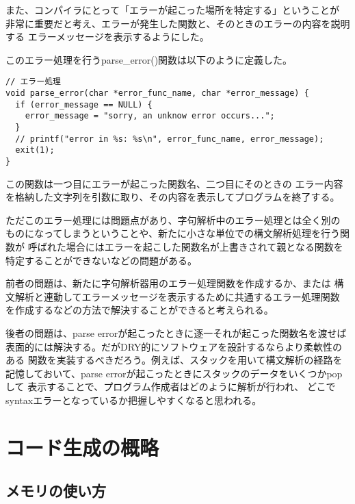 \documentclass[11pt,a4j]{jarticle}
\begin{document}
また、コンパイラにとって「エラーが起こった場所を特定する」ということが
非常に重要だと考え、エラーが発生した関数と、そのときのエラーの内容を説明する
エラーメッセージを表示するようにした。

このエラー処理を行うparse\_error()関数は以下のように定義した。

\begin{verbatim}
// エラー処理
void parse_error(char *error_func_name, char *error_message) {
  if (error_message == NULL) {
    error_message = "sorry, an unknow error occurs...";
  }
  // printf("error in %s: %s\n", error_func_name, error_message);
  exit(1);
}
\end{verbatim}

この関数は一つ目にエラーが起こった関数名、二つ目にそのときの
エラー内容を格納した文字列を引数に取り、その内容を表示してプログラムを終了する。

ただこのエラー処理には問題点があり、字句解析中のエラー処理とは全く別の
ものになってしまうということや、新たに小さな単位での構文解析処理を行う関数が
呼ばれた場合にはエラーを起こした関数名が上書きされて親となる関数を
特定することができないなどの問題がある。

\vspace{0.2in}

前者の問題は、新たに字句解析器用のエラー処理関数を作成するか、または
構文解析と連動してエラーメッセージを表示するために共通するエラー処理関数
を作成するなどの方法で解決することができると考えられる。

\vspace{0.2in}

後者の問題は、parse errorが起こったときに逐一それが起こった関数名を渡せば
表面的には解決する。だがDRY的にソフトウェアを設計するならより柔軟性のある
関数を実装するべきだろう。例えば、スタックを用いて構文解析の経路を
記憶しておいて、parse errorが起こったときにスタックのデータをいくつかpopして
表示することで、プログラム作成者はどのように解析が行われ、
どこでsyntaxエラーとなっているか把握しやすくなると思われる。




\section{コード生成の概略}

\subsection{メモリの使い方}
\end{document}

